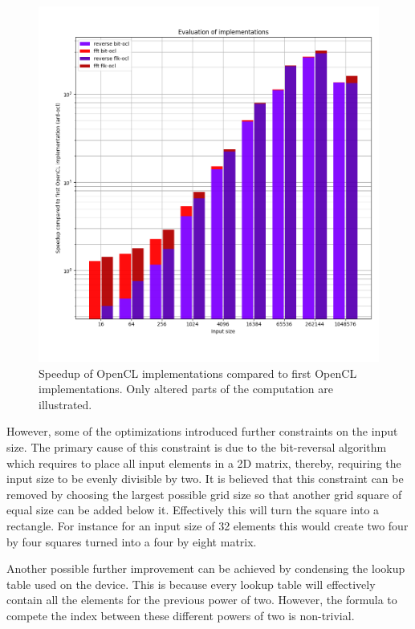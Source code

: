\documentclass[conference]{IEEEtran}
\begin{document}
\begin{figure}[h]
	\centering
	\includegraphics[width=1\linewidth]{resources/images/overal-speedup.png}
	\caption{Speedup of OpenCL implementations compared to first OpenCL
		implementations. Only altered parts of the computation are
		illustrated.}
	\label{fig:speedup}
\end{figure}

However, some of the optimizations introduced further constraints on the
input size. The primary cause of this constraint is due to the bit-reversal
algorithm which requires to place all input elements in a 2D matrix, thereby,
requiring the input size to be evenly divisible by two. It is believed that
this constraint can be removed by choosing the largest possible grid size so
that another grid square of equal size can be added below it. Effectively this
will turn the square into a rectangle. For instance for an input size of 32
elements this would create two four by four squares turned into a four by eight
matrix.

Another possible further improvement can be achieved by condensing the lookup
table used on the device. This is because every lookup table will effectively
contain all the elements for the previous power of two. However, the formula
to compete the index between these different powers of two is non-trivial.
\end{document}

